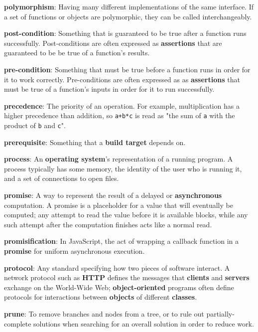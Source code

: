 \documentclass[krantzl]{krantz}
\newcommand{\glosskey}[1]{\textbf{#1}}
\begin{document}
\noindent \textbf{\glosskey{polymorphism}}: 
Having many different implementations of the same interface. If a set of functions or objects are polymorphic, they can be called interchangeably.


\noindent \textbf{\glosskey{post-condition}}: 
Something that is guaranteed to be true after a function runs successfully. Post-conditions are often expressed as \glosskey{assertions} that are guaranteed to be be true of a function's results.


\noindent \textbf{\glosskey{pre-condition}}: 
Something that must be true before a function runs in order for it to work correctly. Pre-conditions are often expressed as as \glosskey{assertions} that must be true of a function's inputs in order for it to run successfully.


\noindent \textbf{\glosskey{precedence}}: 
The priority of an operation. For example, multiplication has a higher precedence than addition, so \texttt{a+b*c} is read as "the sum of \texttt{a} with the product of \texttt{b} and \texttt{c}".


\noindent \textbf{\glosskey{prerequisite}}: 
Something that a \glosskey{build target} depends on.


\noindent \textbf{\glosskey{process}}: 
An \glosskey{operating system}'s representation of a running program. A process typically has some memory, the identity of the user who is running it, and a set of connections to open files.


\noindent \textbf{\glosskey{promise}}: 
A way to represent the result of a delayed or \glosskey{asynchronous} computation. A promise is a placeholder for a value that will eventually be computed; any attempt to read the value before it is available blocks, while any such attempt after the computation finishes acts like a normal read.


\noindent \textbf{\glosskey{promisification}}: 
In JavaScript, the act of wrapping a callback function in a \glosskey{promise} for uniform asynchronous execution.


\noindent \textbf{\glosskey{protocol}}: 
Any standard specifying how two pieces of software interact. A network protocol such as \glosskey{HTTP} defines the messages that \glosskey{clients} and \glosskey{servers} exchange on the World-Wide Web; \glosskey{object-oriented} programs often define protocols for interactions between \glosskey{objects} of different \glosskey{classes}.


\noindent \textbf{\glosskey{prune}}: 
To remove branches and nodes from a tree, or to rule out partially-complete solutions when searching for an overall solution in order to reduce work.
\end{document}
